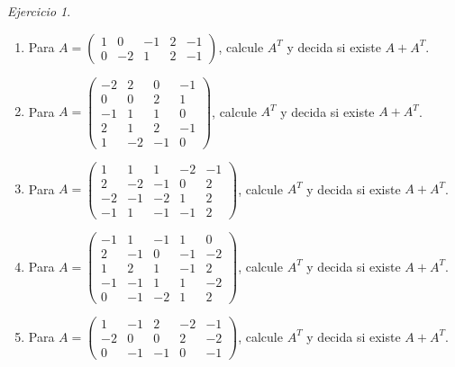 \documentclass[12pt]{article}
\theoremstyle{remark}
\newtheorem{Ejer}[definicion]{Ejercicio}
\begin{document}
\begin{Ejer}
\begin{enumerate}[start=85]
\item Para $A=\begin{pmatrix}1&0&-1&2&-1\\0&-2&1&2&-1\end{pmatrix}$, calcule $A^T$ y decida si existe $A+A^T$.

\item Para $A=\begin{pmatrix}-2&2&0&-1\\0&0&2&1\\-1&1&1&0\\2&1&2&-1\\1&-2&-1&0\end{pmatrix}$, calcule $A^T$ y decida si existe $A+A^T$.

\item Para $A=\begin{pmatrix}1&1&1&-2&-1\\2&-2&-1&0&2\\-2&-1&-2&1&2\\-1&1&-1&-1&2\end{pmatrix}$, calcule $A^T$ y decida si existe $A+A^T$.

\item Para $A=\begin{pmatrix}-1&1&-1&1&0\\2&-1&0&-1&-2\\1&2&1&-1&2\\-1&-1&1&1&-2\\0&-1&-2&1&2\end{pmatrix}$, calcule $A^T$ y decida si existe $A+A^T$.

\item Para $A=\begin{pmatrix}1&-1&2&-2&-1\\-2&0&0&2&-2\\0&-1&-1&0&-1\end{pmatrix}$, calcule $A^T$ y decida si existe $A+A^T$.

\end{enumerate}
\end{Ejer}
\end{document}
